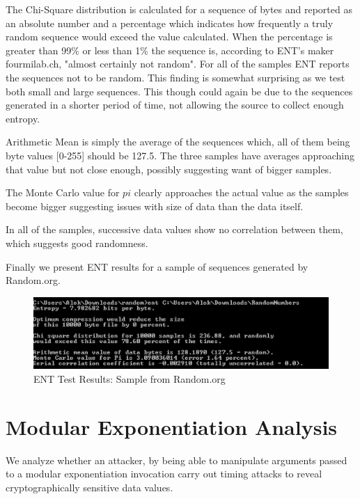 \documentclass{bhamthesis}
\begin{document}
The Chi-Square distribution is calculated for a sequence of bytes and reported as an absolute number and a percentage which indicates how frequently a truly random sequence would exceed the value calculated. When the percentage is greater than 99\%
or less than 1\% the sequence is, according to ENT's maker fourmilab.ch, "almost certainly not random". For all of the samples ENT reports the sequences not to be random. This finding is somewhat surprising as we test both small and large sequences. This though could again be due to the sequences generated in a shorter period of time, not allowing the source to collect enough entropy.\par
Arithmetic Mean is simply the average of the sequences which, all of them being byte values [0-255] should be 127.5. The three samples have averages approaching that value but not close enough, possibly suggesting want of bigger samples.\par
The Monte Carlo value for \(pi\) clearly approaches the actual value as the samples become bigger suggesting issues with size of data than the data itself.\par
In all of the samples, successive data values show no correlation between them, which suggests good randomness.\par
Finally we present ENT results for a sample of sequences generated by Random.org.
\begin{figure}[ht]
\caption{ENT Test Results: Sample from Random.org}
\centering
\includegraphics[width=1\textwidth]{ENT-Test-RandomORG.png}
\end{figure}
\section{Modular Exponentiation Analysis}
We analyze whether an attacker, by being able to manipulate arguments passed to a modular exponentiation invocation carry out timing attacks to reveal cryptographically sensitive data values.
\end{document}
